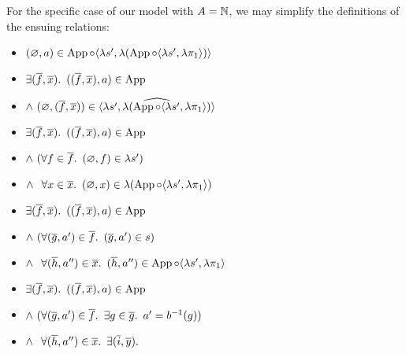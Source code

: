 For the specific case of our model with $A = \mathbb{N}$, we may simplify the definitions of the ensuing relations:
\begin{itemize}
  \item[\phantom{\imps}]
    $(\varnothing,a)\in\operatorname{App}\circ\langle\lambda s^\prime,\lambda(\operatorname{App}\circ\langle\lambda s^\prime,\lambda\pi_1\rangle)\rangle$

  \item[\iffs]
    $\exists (\overline{f},\overline{x})\ldotp~((\overline{f},\overline{x}),a)\in\operatorname{App}$

  \addtolength{\itemsep}{-.5\baselineskip}
  \item[\phantom{\imps}]
    \quad $\land~(\varnothing,(\overline{f},\overline{x}))\in\widehat{\langle\lambda s^\prime,\lambda(\operatorname{App}\circ\langle\lambda s^\prime,\lambda\pi_1\rangle)\rangle}$
  \addtolength{\itemsep}{.5\baselineskip}

  \item[\iffs]
    $\exists (\overline{f},\overline{x})\ldotp~((\overline{f},\overline{x}),a)\in\operatorname{App}$

  \addtolength{\itemsep}{-.5\baselineskip}
  \item[\phantom{\imps}]
    \quad $\land~(\forall f\in\overline{f}\ldotp~(\varnothing,f)\in\lambda s^\prime)$
  \item[\phantom{\imps}]
    \quad $\land~\phantom{(}\forall x\in\overline{x}\ldotp~(\varnothing,x)\in\lambda(\operatorname{App}\circ\langle\lambda s^\prime,\lambda\pi_1\rangle)$
  \addtolength{\itemsep}{.5\baselineskip}

  \item[\iffs]
    $\exists (\overline{f},\overline{x})\ldotp~((\overline{f},\overline{x}),a)\in\operatorname{App}$

  \addtolength{\itemsep}{-.5\baselineskip}
  \item[\phantom{\imps}]
    \quad $\land~(\forall (\overline{g},a^\prime)\in\overline{f}\ldotp~(\overline{g},a^\prime)\in s)$

  \item[\phantom{\imps}]
    \quad $\land~\phantom{(}\forall (\overline{h},a^{\prime\prime})\in\overline{x}\ldotp~(\overline{h},a^{\prime\prime})\in\operatorname{App}\circ\langle\lambda s^\prime,\lambda\pi_1\rangle$
  \addtolength{\itemsep}{.5\baselineskip}

  \item[\iffs]
    $\exists (\overline{f},\overline{x})\ldotp~((\overline{f},\overline{x}),a)\in\operatorname{App}$

  \addtolength{\itemsep}{-.5\baselineskip}
  \item[\phantom{\imps}]
    \quad $\land~(\forall (\overline{g},a^\prime)\in\overline{f}\ldotp~\exists g\in\overline{g}\ldotp~a^\prime = b^{-1}(g))$
  \item[\phantom{\imps}]
    \quad $\land~\phantom{(}\forall(\overline{h},a^{\prime\prime})\in\overline{x}\ldotp~\exists(\overline{i},\overline{y})\ldotp$


\end{itemize}
